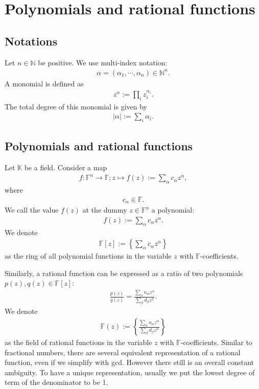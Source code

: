 \documentclass[11pt]{book}
\begin{document}
\section{Polynomials and rational functions}

\subsection{Notations}
Let $n \in \mathbb{N}$ be positive. 
We use multi-index notation:
\begin{eqnarray}
\alpha = (\alpha_1, \cdots, \alpha_n) \in \mathbb{N}^n.
\end{eqnarray}
A monomial is defined as
\begin{eqnarray}
z^\alpha := \prod_i z_i^{\alpha_i}.
\end{eqnarray}
The total degree of this monomial is given by
\begin{eqnarray}
|\alpha| := \sum_i \alpha_i.
\end{eqnarray}

\subsection{Polynomials and rational functions}
Let $\mathbb{K}$ be a field.
Consider a map
\begin{eqnarray}
f : \mathbb{F}^n \to \mathbb{F}; z \mapsto f(z) := \sum_\alpha c_\alpha z^\alpha,
\end{eqnarray}
where
\begin{eqnarray}
c_\alpha \in \mathbb{F}.
\end{eqnarray}
We call the value $f(z)$ at the dummy $z \in \mathbb{F}^n$ a polynomial:
\begin{eqnarray}
f(z) := \sum_\alpha c_\alpha z^\alpha.
\end{eqnarray}
We denote
\begin{eqnarray}
\mathbb{F}[z] := \left\{ \sum_\alpha c_\alpha z^\alpha \right\}
\end{eqnarray}
as the ring of all polynomial functions in the variable $z$ with $\mathbb{F}$-coefficients.

Similarly, a rational function can be expressed as a ratio of two polynomials $p(z),q(z) \in \mathbb{F}[z]$:
\begin{eqnarray}
\frac{p(z)}{q(z)} = \frac{\sum_\alpha n_\alpha z^\alpha}{\sum_\beta d_\beta z^\beta}.
\end{eqnarray}
We denote
\begin{eqnarray}
\mathbb{F}(z) := \left\{ \frac{\sum_\alpha n_\alpha z^\alpha}{\sum_\beta d_\beta z^\beta} \right\}
\end{eqnarray}
as the field of rational functions in the variable $z$ with $\mathbb{F}$-coefficients.
Similar to fractional numbers, there are several equivalent representation of a rational function, even if we simplify with gcd.
However there still is an overall constant ambiguity.
To have a unique representation, usually we put the lowest degree of term of the denominator to be 1.
\end{document}
